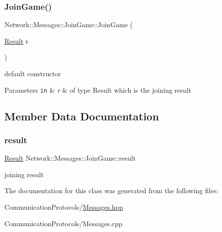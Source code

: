 \subsubsection{\texorpdfstring{Join\+Game()}{JoinGame()}}
{\footnotesize\ttfamily Network\+::\+Messages\+::\+Join\+Game\+::\+Join\+Game (\begin{DoxyParamCaption}\item[{\hyperlink{class_network_1_1_messages_1_1_base_a646d774928c7dfac987228f26ab5d46a}{Result}}]{r }\end{DoxyParamCaption})\hspace{0.3cm}{\ttfamily [inline]}}



default constructor 


\begin{DoxyParams}[1]{Parameters}
\mbox{\tt in}  & {\em r} & of type Result which is the joining result \\
\hline
\end{DoxyParams}


\subsection{Member Data Documentation}
\mbox{\label{class_network_1_1_messages_1_1_join_game_a84370a9ca78dc37baa67e638bcddcc3d}} 
\subsubsection{\texorpdfstring{result}{result}}
{\footnotesize\ttfamily \hyperlink{class_network_1_1_messages_1_1_base_a646d774928c7dfac987228f26ab5d46a}{Result} Network\+::\+Messages\+::\+Join\+Game\+::result}

joining result 

The documentation for this class was generated from the following files\+:\begin{DoxyCompactItemize}
\item 
Communication\+Protocols/\hyperlink{_messages_8hpp}{Messages.\+hpp}\item 
Communication\+Protocols/Messages.\+cpp\end{DoxyCompactItemize}
